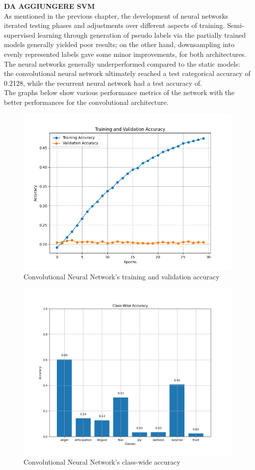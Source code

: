 \textbf{DA AGGIUNGERE SVM}\\


As mentioned in the previous chapter, the development of neural networks
iterated testing phases and adjustments over different aspects of training.
Semi-supervised learning through generation of pseudo labels via the partially
trained models generally yielded poor results; on the other hand, downsampling
into evenly represented labels gave some minor improvements, for both architectures.
The neural networks generally underperformed compared to the static models:
the convolutional neural network ultimately reached a test categorical accuracy
of 0.2128, while the recurrent neural network had a test accuracy of.\\

The graphs below show various performance metrics of the network with the better
performances for the convolutional architecture.
\begin{figure}[H]
    \centering
    \includegraphics[width=0.7\linewidth]{pictures/cnn_accuracy.png}
    \caption{Convolutional Neural Network's training and validation accuracy}
    \label{fig:cnn_train_val_acc}
\end{figure}

\begin{figure}[H]
    \centering
    \includegraphics[width=0.8\linewidth]{pictures/cnn_class_accuracy.png}
    \caption{Convolutional Neural Network's class-wide accuracy}
    \label{fig:cnn_classacc}
\end{figure}

